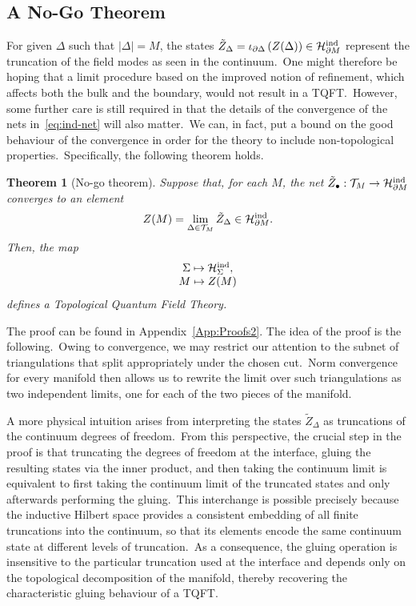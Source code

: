 \documentclass[11pt]{article}
\newcommand{\Hil}{\mathcal{H}}
\newcommand{\Hind}{\mathcal{H}_{\Sigma}^{\rm ind}}
\newcommand{\del}{\partial}
\newcommand{\h}{\mathcal{H}}
\newtheorem{theorem}{Theorem}[section]
\theoremstyle{definition}
\numberwithin{equation}{section}
\begin{document}
\subsection{A No-Go Theorem}\label{Sec:NoGo}

For given $\Delta$ such that $|\Delta|=M$, the states $\tilde{Z}_{\Delta}=\iota_{\del\Delta}\left(Z(\Delta)\right)\in\h_{\del M}^{\rm ind}$ represent the truncation of the field modes as seen in the continuum.~One might therefore be hoping that a limit procedure based on the improved notion of refinement, which affects both the bulk and the boundary, would not result in a TQFT.~However, some further care is still required in that the details of the convergence of the nets in~\eqref{eq:ind-net} will also matter.~We can, in fact, put a bound on the good behaviour of the convergence in order for the theory to include non-topological properties.~Specifically, the following theorem holds.
\begin{theorem}[No-go theorem]
\label{Thm:no-go}
    Suppose that, for each $M$, the net $\tilde{Z}_\bullet: \mathcal{T}_M\to \Hil^{\rm ind}_{\del M}$ converges to an element
    \begin{equation}
        Z(M)=\lim_{\Delta\in\mathcal{T}_M}\tilde{Z}_{\Delta}\in\Hil^{\rm ind}_{\del M}.
    \end{equation}
    Then, the map 
    \begin{equation*}
        \begin{matrix}
            \Sigma\mapsto\Hind,\\
            M\mapsto Z(M)
        \end{matrix}
    \end{equation*}
    defines a Topological Quantum Field Theory.
\end{theorem}
The proof can be found in Appendix~\ref{App:Proofs2}. The idea of the proof is the following.~Owing to convergence, we may restrict our attention to the subnet of triangulations that split appropriately under the chosen cut.~Norm convergence for every manifold then allows us to rewrite the limit over such triangulations as two independent limits, one for each of the two pieces of the manifold.

A more physical intuition arises from interpreting the states $\tilde{Z}_{\Delta}$ as truncations of the continuum degrees of freedom.~From this perspective, the crucial step in the proof is that truncating the degrees of freedom at the interface, gluing the resulting states via the inner product, and then taking the continuum limit is equivalent to first taking the continuum limit of the truncated states and only afterwards performing the gluing.~This interchange is possible precisely because the inductive Hilbert space provides a consistent embedding of all finite truncations into the continuum, so that its elements encode the same continuum state at different levels of truncation.~As a consequence, the gluing operation is insensitive to the particular truncation used at the interface and depends only on the topological decomposition of the manifold, thereby recovering the characteristic gluing behaviour of a TQFT.
\end{document}
